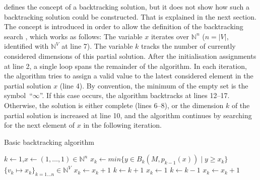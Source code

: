     defines the concept of a backtracking solution, but
    it does not show how such a backtracking solution could be constructed.
    That is explained in the next section.
    The concept is introduced in order to allow the definition of the
    backtracking search , which works as follows:
    The variable $x$ iterates over $\mathbb N^n$
    ($n=|V|$, identified with $\mathbb N^V$ at line 7).
    The variable $k$ tracks the number of currently considered dimensions of
    this partial solution.
    After the initialisation assignments at line 2, a single loop spans the
    remainder of the algorithm.
    In each iteration, the algorithm tries to assign a valid value to the latest
    considered element in the partial solution $x$ (line 4).
    By convention, the minimum of the empty set is the
    \mbox{symbol ``$\infty$''}.
    If this case occurs, the algorithm backtracks at lines 12--17.
    Otherwise, the solution is either complete (lines 6--8), or the dimension
    $k$ of the partial solution is increased at line 10, and the
    algorithm continues by searching for the next element of $x$ in the
    following iteration.

\begin{algorithm}[p]
    \caption{Basic backtracking algorithm}
    \begin{algorithmic}[1]
        \vspace{-0.45em}
            \State $k\gets1$,\quad$x\gets(1,\dots,1)\in\mathbb N^n$\vspace{-0.45em}
            \vspace{-0.45em}
                \State $x_k\gets min\{y\in B_k(M,p_{k-1}(x))\mid y\geq x_k\}$\vspace{-0.45em}
                \vspace{-0.45em}
                    \vspace{-0.45em}
                         $\{v_k\mapsto x_k\}_{k=1\dots n}\in\mathbb N^V$\vspace{-0.45em}
                        \State $x_k\gets x_k+1$\vspace{-0.45em}
                    \Else\vspace{-0.45em}
                        \State $k\gets k+1$\vspace{-0.45em}
                        \State $x_k\gets1$\vspace{-0.45em}
                    \EndIf
                \Else\vspace{-0.45em}
                    \State $k\gets k-1$\vspace{-0.45em}
                    \vspace{-0.45em}
                        \State$x_k\gets x_k+1$\vspace{-0.45em}
                    \Else\vspace{-0.45em}
                    \EndIf
                \EndIf
            \EndWhile
        \EndProcedure
    \end{algorithmic}
    \label{backtrackalg}
\end{algorithm}

